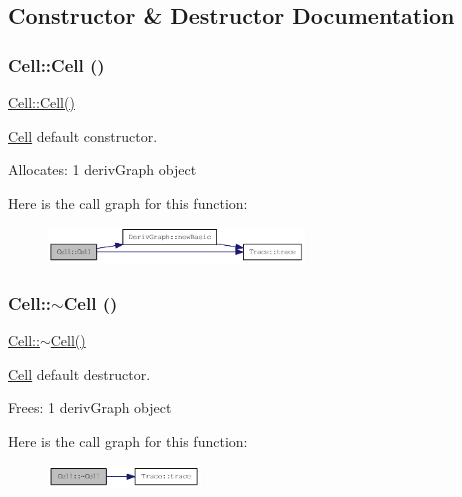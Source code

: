 \subsection{Constructor \& Destructor Documentation}
\hypertarget{classCell_a394510643e8664cf12b5efaf5cb99f71}{
\subsubsection[{Cell}]{\setlength{\rightskip}{0pt plus 5cm}Cell::Cell ()}}
\label{classCell_a394510643e8664cf12b5efaf5cb99f71}
\hyperlink{classCell_a394510643e8664cf12b5efaf5cb99f71}{Cell::Cell()}

\hyperlink{classCell}{Cell} default constructor.

Allocates: 1 derivGraph object 

Here is the call graph for this function:\nopagebreak
\begin{figure}[H]
\begin{center}
\leavevmode
\includegraphics[width=193pt]{classCell_a394510643e8664cf12b5efaf5cb99f71_cgraph}
\end{center}
\end{figure}
\hypertarget{classCell_a9fa559f7a28e2b4336c6879ca09304d8}{
\subsubsection[{$\sim$Cell}]{\setlength{\rightskip}{0pt plus 5cm}Cell::$\sim$Cell ()}}
\label{classCell_a9fa559f7a28e2b4336c6879ca09304d8}
\hyperlink{classCell_a9fa559f7a28e2b4336c6879ca09304d8}{Cell::$\sim$Cell()}

\hyperlink{classCell}{Cell} default destructor.

Frees: 1 derivGraph object 

Here is the call graph for this function:\nopagebreak
\begin{figure}[H]
\begin{center}
\leavevmode
\includegraphics[width=115pt]{classCell_a9fa559f7a28e2b4336c6879ca09304d8_cgraph}
\end{center}
\end{figure}


